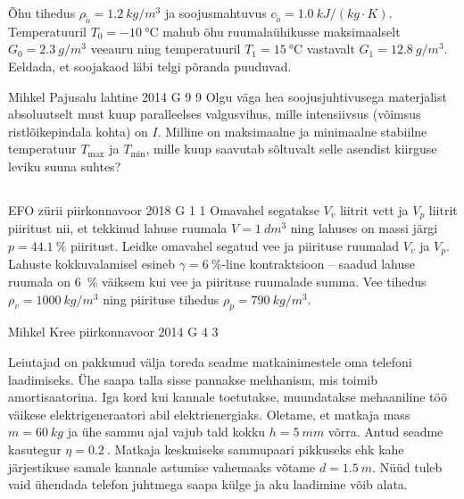 \documentclass[11pt, twoside]{article}
\begin{document}
{{Õhu tihedus $\rho_{\tilde{o}}=\SI{1.2}{kg/m^{3}}$ ja soojusmahtuvus
$c_{\tilde{o}}=\SI{1.0}{kJ/\left(kg\cdot K\right)}$. Temperatuuril
$T_{0}=\SI{-10}{\celsius}$ mahub õhu ruumalaühikusse maksimaalselt
$G_{0}=\SI{2.3}{g/m^{3}}$ veeauru ning temperatuuril $T_{1}=\SI{15}{\celsius}$
vastavalt $G_{1}=\SI{12.8}{g/m^{3}}.$ Eeldada, et soojakaod läbi
telgi põranda puuduvad.
\fi
}

{Mihkel Pajusalu} %
{lahtine} %
{2014} %
{G 9} %
{9} %
{
\ifStatement
Olgu väga hea soojusjuhtivusega materjalist absoluutselt must kuup paralleelses valgusvihus, mille intensiivsus (võimsus ristlõikepindala kohta) on $I$. Milline on maksimaalne ja minimaalne stabiilne temperatuur $T_\text{max}$ ja $T_\text{min}$, mille kuup saavutab sõltuvalt selle asendist kiirguse leviku suuna suhtes?
\fi
}
\newpage\subsection{\protect{}}

{EFO zürii} %
{piirkonnavoor} %
{2018} %
{G 1} %
{1} %
{
\ifStatement
Omavahel segatakse $V_v$ liitrit vett ja $V_p$ liitrit piiritust nii, et tekkinud lahuse ruumala $V=\SI{1}{dm^3}$ ning lahuses on massi järgi $p=\SI{44,1}{\percent}$ piiritust. Leidke omavahel segatud vee ja piirituse ruumalad $V_v$ ja $V_p$. Lahuste kokkuvalamisel esineb $\gamma = \SI{6}{\percent}$-line kontraktsioon -- saadud lahuse ruumala on \SI{6}{\percent} väiksem kui vee ja piirituse ruumalade summa. Vee tihedus $\rho_v=\SI{1000}{kg/m^3}$ ning piirituse tihedus $\rho_p=\SI{790}{kg/m^3}$.
\fi
}

{Mihkel Kree} %
{piirkonnavoor} %
{2014} %
{G 4} %
{3} %
{
\ifStatement
Leiutajad on pakkunud välja toreda seadme matkainimestele oma telefoni laadimiseks. Ühe saapa talla sisse pannakse mehhanism, mis toimib amortisaatorina. Iga kord kui  kannale toetutakse, muundatakse  mehaaniline töö väikese elektrigeneraatori abil elektrienergiaks. Oletame, et matkaja mass $m=\SI{60}{kg}$ ja ühe sammu ajal vajub tald kokku 
$h=\SI{5}{mm}$ võrra. Antud seadme kasutegur $\eta = \SI{0,2}{}$. Matkaja keskmiseks sammupaari pikkuseks ehk kahe järjestikuse samale kannale astumise vahemaaks võtame $d=\SI{1.5}{m}$. Nüüd tuleb vaid ühendada telefon juhtmega saapa külge ja aku laadimine võib alata.

}}
\end{document}
